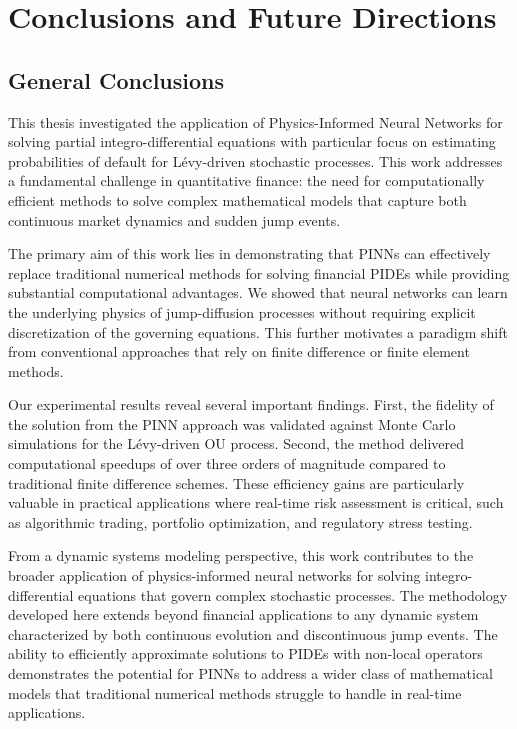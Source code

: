 \documentclass[11pt,twoside,openright]{report}
\begin{document}
\chapter{Conclusions and Future Directions}
\label{ch:conclusions}

\section{General Conclusions}

This thesis investigated the application of Physics-Informed Neural Networks for solving partial integro-differential equations with particular focus on estimating probabilities of default for Lévy-driven stochastic processes. This work addresses a fundamental challenge in quantitative finance: the need for computationally efficient methods to solve complex mathematical models that capture both continuous market dynamics and sudden jump events.

The primary aim of this work lies in demonstrating that PINNs can effectively replace traditional numerical methods for solving financial PIDEs while providing substantial computational advantages. We showed that neural networks can learn the underlying physics of jump-diffusion processes without requiring explicit discretization of the governing equations. This further motivates a paradigm shift from conventional approaches that rely on finite difference or finite element methods.

Our experimental results reveal several important findings. First, the fidelity of the solution from the PINN approach was validated against Monte Carlo simulations for the Lévy-driven OU process. Second, the method delivered computational speedups of over three orders of magnitude compared to traditional finite difference schemes. These efficiency gains are particularly valuable in practical applications where real-time risk assessment is critical, such as algorithmic trading, portfolio optimization, and regulatory stress testing.

From a dynamic systems modeling perspective, this work contributes to the broader application of physics-informed neural networks for solving integro-differential equations that govern complex stochastic processes. The methodology developed here extends beyond financial applications to any dynamic system characterized by both continuous evolution and discontinuous jump events. The ability to efficiently approximate solutions to PIDEs with non-local operators demonstrates the potential for PINNs to address a wider class of mathematical models that traditional numerical methods struggle to handle in real-time applications.
\end{document}
